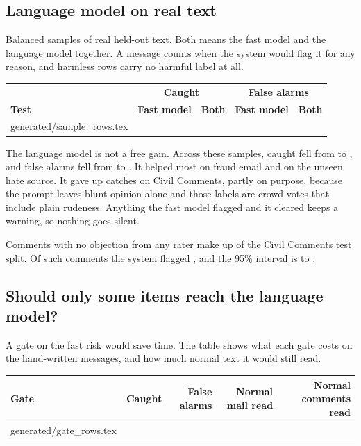 \documentclass[11pt,a4paper]{article}
\makeatletter
\newcommand{\need}[1][10]{\Needspace{#1\baselineskip}}
\newcommand{\tablerows}[1]{\@@input #1 }
\makeatother
\begin{document}
\need[12]
\subsection*{Language model on real text}

Balanced samples of real held-out text. Both means the fast model and the language model together. A message counts when the system would flag it for any reason, and harmless rows carry no harmful label at all.

\begin{center}
\small
\begin{tabular}{@{}lrrrr@{}}
\toprule
 & \multicolumn{2}{c}{\textbf{Caught}} & \multicolumn{2}{c}{\textbf{False alarms}} \\
\textbf{Test} & \textbf{Fast model} & \textbf{Both} & \textbf{Fast model} & \textbf{Both} \\
\midrule
\tablerows{generated/sample_rows.tex}
\bottomrule
\end{tabular}
\end{center}

The language model is not a free gain. Across these samples, caught fell from \sampleFastCaught{} to \sampleBothCaught{}, and false alarms fell from \sampleFastWrong{} to \sampleBothWrong{}. It helped most on fraud email and on the unseen hate source. It gave up catches on Civil Comments, partly on purpose, because the prompt leaves blunt opinion alone and those labels are crowd votes that include plain rudeness. Anything the fast model flagged and it cleared keeps a warning, so nothing goes silent.

Comments with no objection from any rater make up \clearShare{} of the Civil Comments test split. Of \clearSize{} such comments the system flagged \clearBoth{}, and the 95\% interval is \clearLow{} to \clearHigh{}.

\need[11]
\subsection*{Should only some items reach the language model?}

A gate on the fast risk would save time. The table shows what each gate costs on the hand-written messages, and how much normal text it would still read.

\begin{center}
\small
\begin{tabular}{@{}lrrrr@{}}
\toprule
\textbf{Gate} & \textbf{Caught} & \textbf{False alarms} & \textbf{Normal mail read} & \textbf{Normal comments read} \\
\midrule
\tablerows{generated/gate_rows.tex}
\bottomrule
\end{tabular}
\end{center}
\end{document}
